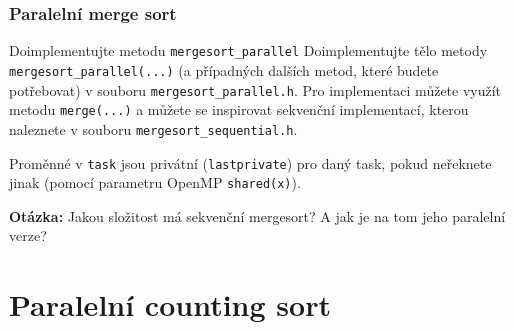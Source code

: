 \documentclass[usenames,dvipsnames,9pt]{beamer}
\begin{document}
{
\begin{frame}[fragile]
\frametitle{Paralelní merge sort}

  \begin{block}{Doimplementujte metodu \texttt{mergesort\_parallel}}
    Doimplementujte tělo metody \texttt{mergesort\_parallel(...)} (a případných dalších metod, které budete potřebovat) v souboru \texttt{mergesort\_parallel.h}.
    Pro implementaci můžete využít metodu \texttt{merge(...)} a můžete se inspirovat sekvenční implementací, kterou naleznete v souboru \texttt{mergesort\_sequential.h}.
  \end{block}
  
  \vspace{2em}
  
  \begin{center}
  	\large \faWarning \hspace{3pt} Proměnné v \texttt{task} jsou privátní (\texttt{lastprivate}) pro daný task, pokud neřeknete jinak (pomocí parametru OpenMP \texttt{shared(x)}).
  \end{center}
  
\end{frame}

\begin{frame}
	\textbf{Otázka:} Jakou složitost má sekvenční mergesort? A jak je na tom jeho paralelní verze?
\end{frame}
}

\section{Paralelní counting sort}
\end{document}

